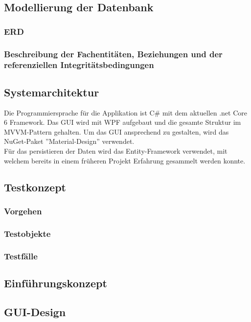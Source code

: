 \subsection{Modellierung der Datenbank}

\subsubsection{ERD}

\subsubsection{Beschreibung der Fachentitäten, Beziehungen und der referenziellen Integritätsbedingungen}

\subsection{Systemarchitektur}
Die Programmiersprache für die Applikation ist C\# mit dem aktuellen .net Core 6 Framework. Das GUI wird mit WPF aufgebaut und die gesamte Struktur im MVVM-Pattern gehalten. Um das GUI ansprechend zu gestalten, wird das NuGet-Paket ''Material-Design'' verwendet.\\
Für das persistieren der Daten wird das Entity-Framework verwendet, mit welchem bereits in einem früheren Projekt Erfahrung gesammelt werden konnte.
\subsection{Testkonzept} \label{testkonzept}
\subsubsection{Vorgehen}
\subsubsection{Testobjekte}
\subsubsection{Testfälle}
\subsection{Einführungskonzept}
\subsection{GUI-Design}